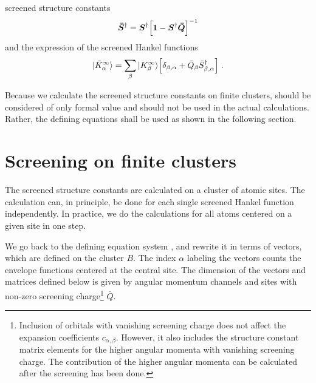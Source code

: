 \documentclass[11pt,a4paper]{report}
\begin{document}
\begin{myshadowminipage}{screened structure constants}
\begin{eqnarray}
\bm{\bar{S}}^\dagger=\bm{S}^\dagger
\Bigl[\bm{1}-\bm{S}^\dagger\bm{\bar{Q}}\Bigr]^{-1}
\label{eq:defscreenedstructureconstants}
\end{eqnarray}
and the expression of the screened Hankel functions 
\begin{eqnarray}
|\bar{K}^\infty_\alpha\rangle=\sum_\beta |K^\infty_\beta\rangle
\Bigl[\delta_{\beta,\alpha}+
\bar{Q}_\beta \bar{S}^\dagger_{\beta,\alpha}\Bigr]
\;.
\end{eqnarray}

Because we calculate the screened structure constants on finite
clusters,  should be considered
of only formal value and should not be used in the actual
calculations. Rather, the defining equations
 shall be used as shown in the
following section.
\end{myshadowminipage}{}

\section{Screening on finite clusters}
The screened structure constants are calculated on a cluster of atomic
sites. The calculation can, in principle, be done for each single
screened Hankel function independently. In practice, we do the
calculations for all atoms centered on a given site in one step.

We go back to the defining equation system
,  and
rewrite it in terms of vectors, which are defined on the cluster
$B$. The index $\alpha$ labeling the vectors counts the envelope
functions centered at the central site. The dimension of the vectors
and matrices defined below is given by angular momentum channels and
sites with non-zero screening charge\footnote{Inclusion of orbitals
  with vanishing screening charge does not affect the expansion
  coefficients $c_{\alpha,\beta}$. However, it also includes the
  structure constant matrix elements for the higher angular momenta
  with vanishing screening charge. The contribution of the higher
  angular momenta can be calculated after the screening has been
  done.} $\bar{Q}$.
\end{document}
